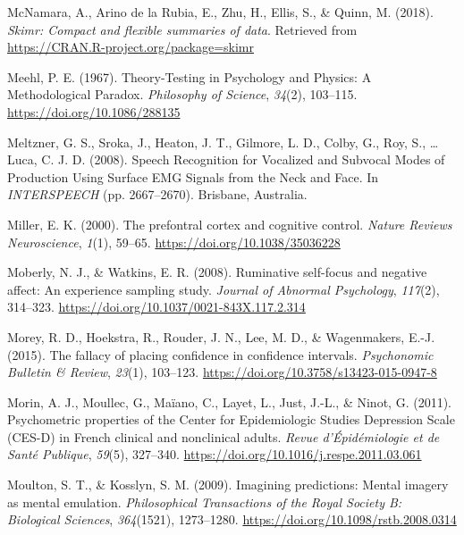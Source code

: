 \documentclass[a4paper,12pt,twoside,openright,oldfontcommands]{memoir}
\begin{document}
\leavevmode\hypertarget{ref-R-skimr}{}%
McNamara, A., Arino de la Rubia, E., Zhu, H., Ellis, S., \& Quinn, M. (2018). \emph{Skimr: Compact and flexible summaries of data}. Retrieved from \url{https://CRAN.R-project.org/package=skimr}

\leavevmode\hypertarget{ref-meehl_theory-testing_1967}{}%
Meehl, P. E. (1967). Theory-Testing in Psychology and Physics: A Methodological Paradox. \emph{Philosophy of Science}, \emph{34}(2), 103--115. \url{https://doi.org/10.1086/288135}

\leavevmode\hypertarget{ref-meltzner_speech_2008}{}%
Meltzner, G. S., Sroka, J., Heaton, J. T., Gilmore, L. D., Colby, G., Roy, S., \ldots{} Luca, C. J. D. (2008). Speech Recognition for Vocalized and Subvocal Modes of Production Using Surface EMG Signals from the Neck and Face. In \emph{INTERSPEECH} (pp. 2667--2670). Brisbane, Australia.

\leavevmode\hypertarget{ref-miller_prefontral_2000}{}%
Miller, E. K. (2000). The prefontral cortex and cognitive control. \emph{Nature Reviews Neuroscience}, \emph{1}(1), 59--65. \url{https://doi.org/10.1038/35036228}

\leavevmode\hypertarget{ref-Moberly2008}{}%
Moberly, N. J., \& Watkins, E. R. (2008). Ruminative self-focus and negative affect: An experience sampling study. \emph{Journal of Abnormal Psychology}, \emph{117}(2), 314--323. \url{https://doi.org/10.1037/0021-843X.117.2.314}

\leavevmode\hypertarget{ref-morey_fallacy_2015}{}%
Morey, R. D., Hoekstra, R., Rouder, J. N., Lee, M. D., \& Wagenmakers, E.-J. (2015). The fallacy of placing confidence in confidence intervals. \emph{Psychonomic Bulletin \& Review}, \emph{23}(1), 103--123. \url{https://doi.org/10.3758/s13423-015-0947-8}

\leavevmode\hypertarget{ref-morin_psychometric_2011}{}%
Morin, A. J., Moullec, G., Maïano, C., Layet, L., Just, J.-L., \& Ninot, G. (2011). Psychometric properties of the Center for Epidemiologic Studies Depression Scale (CES-D) in French clinical and nonclinical adults. \emph{Revue d'Épidémiologie et de Santé Publique}, \emph{59}(5), 327--340. \url{https://doi.org/10.1016/j.respe.2011.03.061}

\leavevmode\hypertarget{ref-moulton_imagining_2009}{}%
Moulton, S. T., \& Kosslyn, S. M. (2009). Imagining predictions: Mental imagery as mental emulation. \emph{Philosophical Transactions of the Royal Society B: Biological Sciences}, \emph{364}(1521), 1273--1280. \url{https://doi.org/10.1098/rstb.2008.0314}
\end{document}
